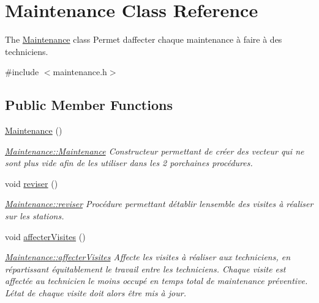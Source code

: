 \hypertarget{class_maintenance}{}\section{Maintenance Class Reference}
\label{class_maintenance}


The \hyperlink{class_maintenance}{Maintenance} class Permet d\textquotesingle{}affecter chaque maintenance à faire à des techniciens.  




{\ttfamily \#include $<$maintenance.\+h$>$}

\subsection*{Public Member Functions}
\begin{DoxyCompactItemize}
\item 
\mbox{\label{class_maintenance_a8b51c17cc3e17405ce39fb2ec973df99}} 
\hyperlink{class_maintenance_a8b51c17cc3e17405ce39fb2ec973df99}{Maintenance} ()
\begin{DoxyCompactList}\small\item\em \hyperlink{class_maintenance_a8b51c17cc3e17405ce39fb2ec973df99}{Maintenance\+::\+Maintenance} Constructeur permettant de créer des vecteur qui ne sont plus vide afin de les utiliser dans les 2 porchaines procédures. \end{DoxyCompactList}\item 
\mbox{\label{class_maintenance_a626bf6af87da611c75d0d83d1630dac1}} 
void \hyperlink{class_maintenance_a626bf6af87da611c75d0d83d1630dac1}{reviser} ()
\begin{DoxyCompactList}\small\item\em \hyperlink{class_maintenance_a626bf6af87da611c75d0d83d1630dac1}{Maintenance\+::reviser} Procédure permettant d\textquotesingle{}établir l\textquotesingle{}ensemble des visites à réaliser sur les stations. \end{DoxyCompactList}\item 
\mbox{\label{class_maintenance_a1f6bef0a1a529beeaea5ab622f473782}} 
void \hyperlink{class_maintenance_a1f6bef0a1a529beeaea5ab622f473782}{affecter\+Visites} ()
\begin{DoxyCompactList}\small\item\em \hyperlink{class_maintenance_a1f6bef0a1a529beeaea5ab622f473782}{Maintenance\+::affecter\+Visites} Affecte les visites à réaliser aux techniciens, en répartissant équitablement le travail entre les techniciens. Chaque visite est affectée au technicien le moins occupé en temps total de maintenance préventive. L\textquotesingle{}état de chaque visite doit alors être mis à jour. \end{DoxyCompactList}\item 

\end{DoxyCompactItemize}
